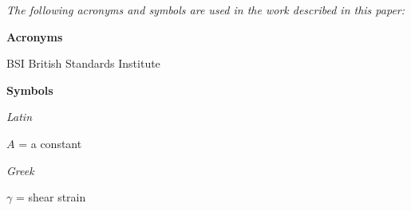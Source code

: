 \documentclass[a4paper,10pt]{article}
\begin{document}
\textit{The following acronyms and symbols are used in the work described in this paper:}

\textbf{Acronyms}

BSI	 British Standards Institute

\textbf{Symbols}

\textit{Latin}

$A$ = a constant

\textit{Greek}

$\gamma$ = shear strain



\fontsize{8}{9}\selectfont




\clearpage
\end{document}
